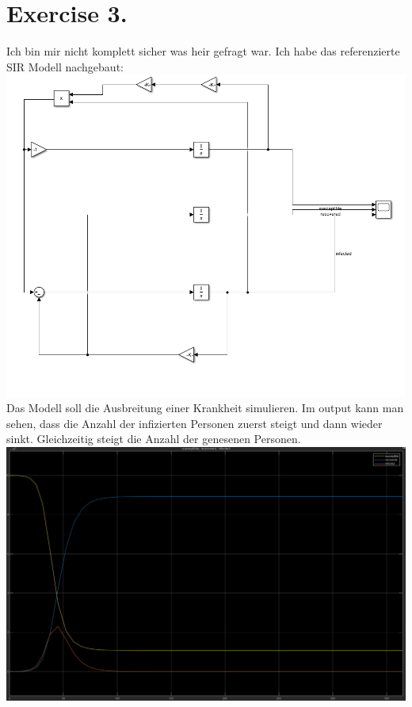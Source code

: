 \documentclass{scrartcl}
\begin{document}
\section*{Exercise 3. }
Ich bin mir nicht komplett sicher was heir gefragt war. Ich habe das referenzierte SIR Modell nachgebaut:\\
\includegraphics[scale=0.3]{sirModell.png}\\
Das Modell soll die Ausbreitung einer Krankheit simulieren. Im output kann man sehen, dass die Anzahl der infizierten Personen zuerst steigt und dann wieder sinkt. Gleichzeitig steigt die Anzahl der genesenen Personen.\\
\includegraphics[scale=0.3]{sirout.png}
\end{document}
